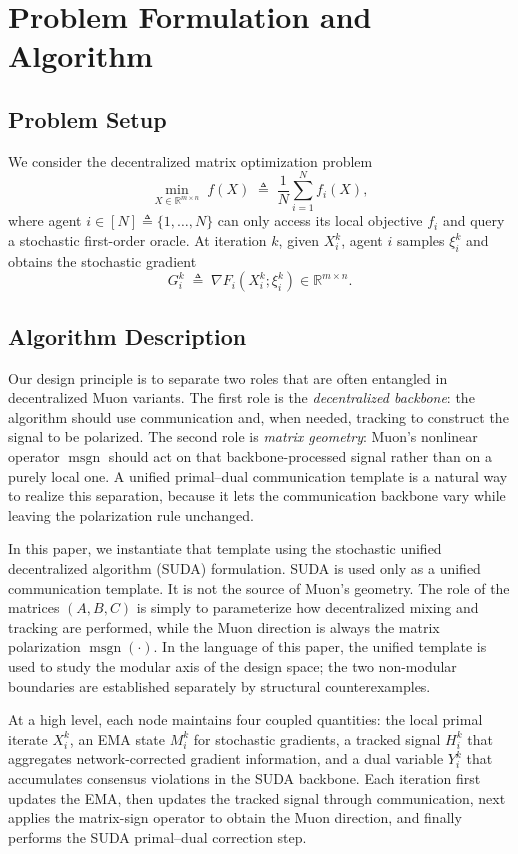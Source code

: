 \documentclass{article}
\begin{document}
\section{Problem Formulation and Algorithm}\label{sec:method}

\subsection{Problem Setup}

We consider the decentralized matrix optimization problem
\[
    \min_{X\in\mathbb{R}^{m\times n}}\; f(X)\;\triangleq\;\frac{1}{N}\sum_{i=1}^N f_i(X),
\]
where agent $i\in[N]\triangleq\{1,\dots,N\}$ can only access its local objective $f_i$ and query a stochastic first-order oracle.
At iteration $k$, given $X_i^k$, agent $i$ samples $\xi_i^k$ and obtains the stochastic gradient
\[
    G_i^k \;\triangleq\; \nabla F_i(X_i^k;\xi_i^k)\in\mathbb{R}^{m\times n}.
\]

\subsection{Algorithm Description}

Our design principle is to separate two roles that are often entangled in decentralized Muon variants. The first role is the \emph{decentralized backbone}: the algorithm should use communication and, when needed, tracking to construct the signal to be polarized. The second role is \emph{matrix geometry}: Muon's nonlinear operator $\operatorname{msgn}$ should act on that backbone-processed signal rather than on a purely local one. A unified primal--dual communication template is a natural way to realize this separation, because it lets the communication backbone vary while leaving the polarization rule unchanged.

In this paper, we instantiate that template using the stochastic unified decentralized algorithm (SUDA) formulation. SUDA is used only as a unified communication template. It is not the source of Muon's geometry. The role of the matrices $(A,B,C)$ is simply to parameterize how decentralized mixing and tracking are performed, while the Muon direction is always the matrix polarization $\operatorname{msgn}(\cdot)$. In the language of this paper, the unified template is used to study the modular axis of the design space; the two non-modular boundaries are established separately by structural counterexamples.

At a high level, each node maintains four coupled quantities: the local primal iterate $X_i^k$, an EMA state $M_i^k$ for stochastic gradients, a tracked signal $H_i^k$ that aggregates network-corrected gradient information, and a dual variable $Y_i^k$ that accumulates consensus violations in the SUDA backbone. Each iteration first updates the EMA, then updates the tracked signal through communication, next applies the matrix-sign operator to obtain the Muon direction, and finally performs the SUDA primal--dual correction step.
\end{document}
